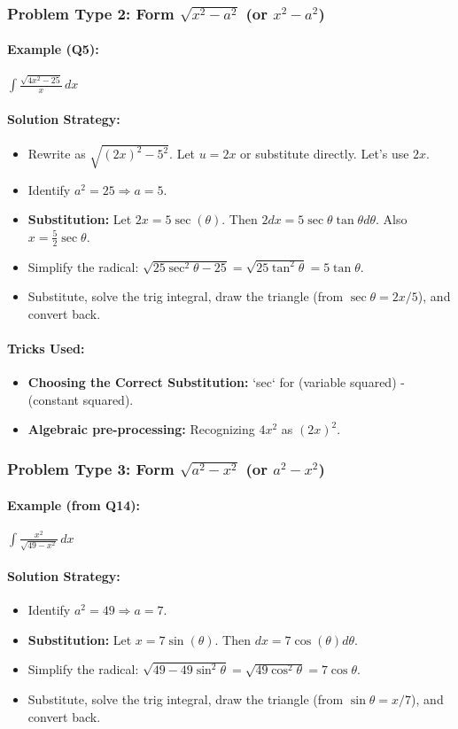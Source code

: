 \documentclass{article}
\begin{document}
\subsubsection{Problem Type 2: Form $ \sqrt{x^2-a^2} $ (or $x^2-a^2$)}
\paragraph{Example (Q5):} $ \int \frac{\sqrt{4x^2-25}}{x} \,dx $
\paragraph{Solution Strategy:}
\begin{itemize}
    \item Rewrite as $\sqrt{(2x)^2-5^2}$. Let $u=2x$ or substitute directly. Let's use $2x$.
    \item Identify $a^2=25 \Rightarrow a=5$.
    \item \textbf{Substitution:} Let $2x = 5\sec(\theta)$. Then $2dx = 5\sec\theta\tan\theta d\theta$. Also $x=\frac{5}{2}\sec\theta$.
    \item Simplify the radical: $\sqrt{25\sec^2\theta - 25} = \sqrt{25\tan^2\theta} = 5\tan\theta$.
    \item Substitute, solve the trig integral, draw the triangle (from $\sec\theta = 2x/5$), and convert back.
\end{itemize}
\paragraph{Tricks Used:}
\begin{itemize}
    \item \textbf{Choosing the Correct Substitution:} `sec` for (variable squared) - (constant squared).
    \item \textbf{Algebraic pre-processing:} Recognizing $4x^2$ as $(2x)^2$.
\end{itemize}

\subsubsection{Problem Type 3: Form $ \sqrt{a^2-x^2} $ (or $a^2-x^2$)}
\paragraph{Example (from Q14):} $ \int \frac{x^2}{\sqrt{49-x^2}} \,dx $
\paragraph{Solution Strategy:}
\begin{itemize}
    \item Identify $a^2=49 \Rightarrow a=7$.
    \item \textbf{Substitution:} Let $x = 7\sin(\theta)$. Then $dx=7\cos(\theta)d\theta$.
    \item Simplify the radical: $\sqrt{49-49\sin^2\theta} = \sqrt{49\cos^2\theta} = 7\cos\theta$.
    \item Substitute, solve the trig integral, draw the triangle (from $\sin\theta = x/7$), and convert back.
\end{itemize}
\end{document}
